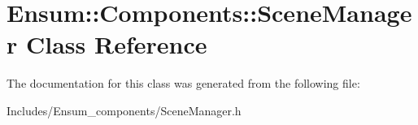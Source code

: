 \hypertarget{class_ensum_1_1_components_1_1_scene_manager}{}\section{Ensum\+:\+:Components\+:\+:Scene\+Manager Class Reference}
\label{class_ensum_1_1_components_1_1_scene_manager}


The documentation for this class was generated from the following file\+:\begin{DoxyCompactItemize}
\item 
Includes/\+Ensum\+\_\+components/Scene\+Manager.\+h\end{DoxyCompactItemize}
